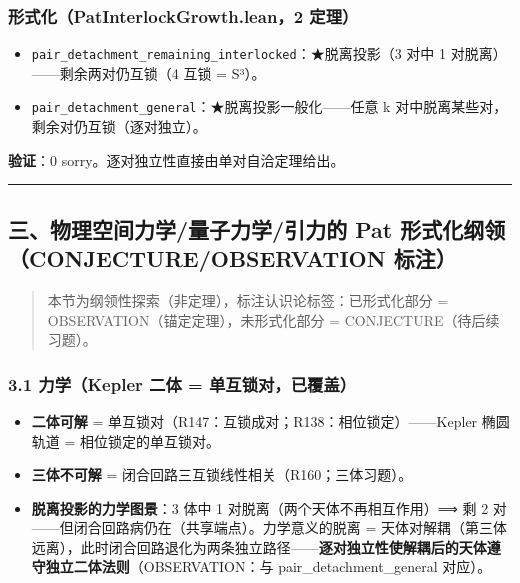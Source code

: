 \documentclass[
]{article}
\providecommand{\tightlist}{%
 \setlength{\itemsep}{0pt}\setlength{\parskip}{0pt}}
\begin{document}
\subsubsection{形式化（PatInterlockGrowth.lean，2
定理）}\label{ux5f62ux5f0fux5316patinterlockgrowth.lean2-ux5b9aux7406}

\begin{itemize}
\tightlist
\item
 \texttt{pair\_detachment\_remaining\_interlocked}：★脱离投影（3 对中 1
 对脱离）------剩余两对仍互锁（4 互锁 = S³）。
\item
 \texttt{pair\_detachment\_general}：★脱离投影一般化------任意 k
 对中脱离某些对，剩余对仍互锁（逐对独立）。
\end{itemize}

\textbf{验证}：0 sorry。逐对独立性直接由单对自洽定理给出。

\begin{center}\rule{0.5\linewidth}{0.5pt}\end{center}

\subsection{三、物理空间力学/量子力学/引力的 Pat
形式化纲领（CONJECTURE/OBSERVATION
标注）}\label{ux4e09ux7269ux7406ux7a7aux95f4ux529bux5b66ux91cfux5b50ux529bux5b66ux5f15ux529bux7684-pat-ux5f62ux5f0fux5316ux7eb2ux9886conjectureobservation-ux6807ux6ce8}

\begin{quote}
本节为纲领性探索（非定理），标注认识论标签：已形式化部分 =
OBSERVATION（锚定定理），未形式化部分 = CONJECTURE（待后续习题）。
\end{quote}

\subsubsection{3.1 力学（Kepler 二体 =
单互锁对，已覆盖）}\label{ux529bux5b66kepler-ux4e8cux4f53-ux5355ux4e92ux9501ux5bf9ux5df2ux8986ux76d6}

\begin{itemize}
\tightlist
\item
 \textbf{二体可解} =
 单互锁对（R147：互锁成对；R138：相位锁定）------Kepler 椭圆轨道 =
 相位锁定的单互锁对。
\item
 \textbf{三体不可解} = 闭合回路三互锁线性相关（R160；三体习题）。
\item
 \textbf{脱离投影的力学图景}：3 体中 1 对脱离（两个天体不再相互作用）⟹
 剩 2 对------但闭合回路病仍在（共享端点）。力学意义的脱离 =
 天体对解耦（第三体远离），此时闭合回路退化为两条独立路径------\textbf{逐对独立性使解耦后的天体遵守独立二体法则}（OBSERVATION：与
 pair\_detachment\_general 对应）。
\end{itemize}
\end{document}
